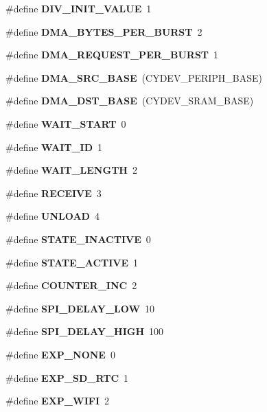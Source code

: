 \begin{DoxyCompactItemize}
\item 
\#define \textbf{ D\+I\+V\+\_\+\+I\+N\+I\+T\+\_\+\+V\+A\+L\+UE}~1
\item 
\mbox{\label{globals_8h_abf6c9afec04b86961e177e0646401ace}} 
\#define {\bfseries D\+M\+A\+\_\+\+B\+Y\+T\+E\+S\+\_\+\+P\+E\+R\+\_\+\+B\+U\+R\+ST}~2
\item 
\mbox{\label{globals_8h_ab4613f8bee68bc68fa6fe94a3ae6d568}} 
\#define {\bfseries D\+M\+A\+\_\+\+R\+E\+Q\+U\+E\+S\+T\+\_\+\+P\+E\+R\+\_\+\+B\+U\+R\+ST}~1
\item 
\mbox{\label{globals_8h_a3cc2eedb40809a1f15ad841c8abbcebf}} 
\#define {\bfseries D\+M\+A\+\_\+\+S\+R\+C\+\_\+\+B\+A\+SE}~(C\+Y\+D\+E\+V\+\_\+\+P\+E\+R\+I\+P\+H\+\_\+\+B\+A\+SE)
\item 
\mbox{\label{globals_8h_aa54e301f446a66cbf8c943d920c8e967}} 
\#define {\bfseries D\+M\+A\+\_\+\+D\+S\+T\+\_\+\+B\+A\+SE}~(C\+Y\+D\+E\+V\+\_\+\+S\+R\+A\+M\+\_\+\+B\+A\+SE)
\item 
\#define \textbf{ W\+A\+I\+T\+\_\+\+S\+T\+A\+RT}~0
\item 
\#define \textbf{ W\+A\+I\+T\+\_\+\+ID}~1
\item 
\#define \textbf{ W\+A\+I\+T\+\_\+\+L\+E\+N\+G\+TH}~2
\item 
\#define \textbf{ R\+E\+C\+E\+I\+VE}~3
\item 
\#define \textbf{ U\+N\+L\+O\+AD}~4
\item 
\#define \textbf{ S\+T\+A\+T\+E\+\_\+\+I\+N\+A\+C\+T\+I\+VE}~0
\item 
\#define \textbf{ S\+T\+A\+T\+E\+\_\+\+A\+C\+T\+I\+VE}~1
\item 
\#define \textbf{ C\+O\+U\+N\+T\+E\+R\+\_\+\+I\+NC}~2
\item 
\mbox{\label{globals_8h_a42c6406a75a89d50c9f1b9c86388565c}} 
\#define {\bfseries S\+P\+I\+\_\+\+D\+E\+L\+A\+Y\+\_\+\+L\+OW}~10
\item 
\mbox{\label{globals_8h_a054002df34537a2a4ff6f520b65f1ba4}} 
\#define {\bfseries S\+P\+I\+\_\+\+D\+E\+L\+A\+Y\+\_\+\+H\+I\+GH}~100
\item 
\mbox{\label{globals_8h_a963cfc2155941aff08c02b451042c295}} 
\#define {\bfseries E\+X\+P\+\_\+\+N\+O\+NE}~0
\item 
\mbox{\label{globals_8h_a6a936c7ef5908ffabf8be42833a3daee}} 
\#define {\bfseries E\+X\+P\+\_\+\+S\+D\+\_\+\+R\+TC}~1
\item 
\mbox{\label{globals_8h_a25767403f2ad21cf275206135269647e}} 
\#define {\bfseries E\+X\+P\+\_\+\+W\+I\+FI}~2
\item 
\mbox{\label{globals_8h_a265e7aabffe2182cd632b15dd02a9efb}} 

\end{DoxyCompactItemize}
